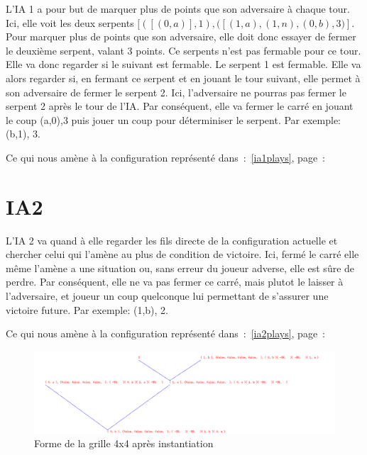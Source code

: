 \documentclass[a4paper,12pt]{report}
\begin{document}
L'IA 1 a pour but de marquer plus de points que son adversaire \`a chaque tour. Ici, elle voit les deux serpents $[([(0,a)],1),([(1,a),(1,n),(0,b), 3)]$. Pour marquer plus de points que son adversaire, elle doit donc essayer de fermer le deuxi\`eme serpent, valant 3 points. Ce serpents n'est pas fermable pour ce tour. Elle va donc regarder si le suivant est fermable. Le serpent 1 est fermable. Elle va alors regarder si, en fermant ce serpent et en jouant le tour suivant, elle permet \`a son adversaire de fermer le serpent 2. Ici, l'adversaire ne pourras pas fermer le serpent 2 apr\`es le tour de l'IA. Par cons\'equent, elle va fermer le carr\'e en jouant le coup (a,0),3 puis jouer un coup pour d\'eterminiser le serpent. Par exemple: (b,1), 3.

Ce qui nous am\`ene \`a la configuration repr\'esent\'e dans~:~\autoref{ia1plays}, page~:~\pageref{ia1plays}

\section{IA2}

L'IA 2 va quand \`a elle regarder les fils directe de la configuration actuelle et chercher celui qui l'am\`ene au plus de condition de victoire. Ici, ferm\'e le carr\'e elle m\^eme l'am\`ene a une situation ou, sans erreur du joueur adverse, elle est s\^ure de perdre. Par cons\'equent, elle ne va pas fermer ce carr\'e, mais plutot le laisser \`a l'adversaire, et joueur un coup quelconque lui permettant de s'assurer une victoire future. Par exemple: (1,b), 2.

Ce qui nous am\`ene \`a la configuration repr\'esent\'e dans~:~\autoref{ia2plays}, page~:~\pageref{ia2plays}
\begin{figure}[p]
	\includegraphics[width=15cm]{images/grid.png}
	\caption{\label{newgrid}Forme de la grille 4x4 apr\`es instantiation}
\end{figure}
\end{document}
